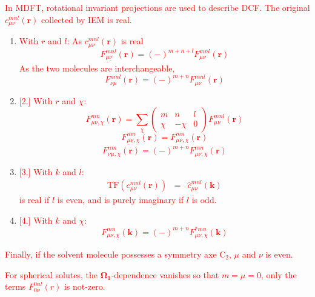 \textcolor{red}{In MDFT, rotational invariant projections are used
to describe DCF. The original $c_{\mu\nu}^{mnl}(\mathbf{r})$ collected
by IEM is real.}
\begin{enumerate}
\item \textcolor{red}{With $r$ and $l$: As $c_{\mu\nu}^{mnl}(\mathbf{r})$
is real
\begin{equation}
F_{\underline{\mu}\underline{\nu}}^{mnl}(\mathbf{r})=\left(-\right)^{m+n+l}F_{\mu\nu}^{mnl}(\mathbf{r})
\end{equation}
As the two molecules are interchangeable, 
\begin{equation}
F_{\nu\mu}^{nml}(\mathbf{r})=\left(-\right)^{m+n}F_{\mu\nu}^{mnl}(\mathbf{r})
\end{equation}
}
\item \textcolor{red}{%
[2.]%
With $r$ and $\chi$:
\begin{equation}
F_{\mu\nu,\chi}^{mn}(\mathbf{r})=\sum_{\chi}\left(\begin{array}{ccc}
m & n & l\\
\chi & -\chi & 0
\end{array}\right)F_{\mu\nu}^{mnl}(\mathbf{r})
\end{equation}
\begin{equation}
F_{\underline{\mu}\underline{\nu},\underline{\chi}}^{mn}(\mathbf{r})=F_{\mu\nu,\chi}^{mn}(\mathbf{r})
\end{equation}
\begin{equation}
F_{\nu\mu,\chi}^{nm}(\mathbf{r})=\left(-\right)^{m+n}F_{\mu\nu,\chi}^{mn}(\mathbf{r})
\end{equation}
}
\item \textcolor{red}{%
[3.]%
With $k$ and $l$:
\begin{eqnarray}
\mathrm{TF}(c_{\mu\nu}^{mnl}(\mathbf{r})) & = & \hat{c}_{\mu\nu}^{mnl}(\mathbf{k})
\end{eqnarray}
 is real if $l$ is even, and is purely imaginary if $l$ is odd.}
\item \textcolor{red}{%
[4.]%
With $k$ and $\chi$:
\begin{equation}
F_{\mu\nu,\underline{\chi}}^{mn}(\mathbf{k})=\left(-\right)^{m+n}F_{\mu\nu,\chi}^{*mn}(\mathbf{k})
\end{equation}
}
\end{enumerate}
\textcolor{red}{Finally, if the solvent molecule possesses a symmetry
axe $\mathrm{C}_{2}$, $\mu$ and $\nu$ is even.}

\textcolor{red}{For spherical solutes, the $\mathbf{\Omega_{1}}$-dependence
vanishes so that $m=\mu=0$, only the terms $F_{0\nu}^{0nl}(r)$ is
not-zero.}
